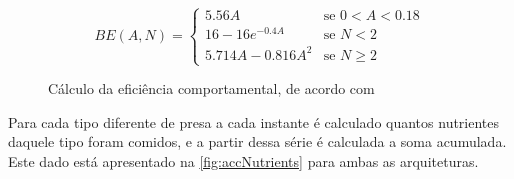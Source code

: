 \begin{figure}[H]
    \caption{Cálculo da eficiência comportamental, de acordo com }
    \[BE(A,N) = 
    \begin{cases}
        5.56A & \text{se } 0 < A < 0.18\\
        16 - 16e^{-0.4A} & \text{se } N < 2\\
        5.714A -  0.816A^2 & \text{se } N \geq 2
    \end{cases}\]
    \label{eq:behEfficiency}
\end{figure}

Para cada tipo diferente de presa a cada instante é calculado quantos nutrientes daquele tipo foram comidos, e a partir dessa série é calculada a soma acumulada. Este dado está apresentado na \autoref{fig:accNutrients} para ambas as arquiteturas.

